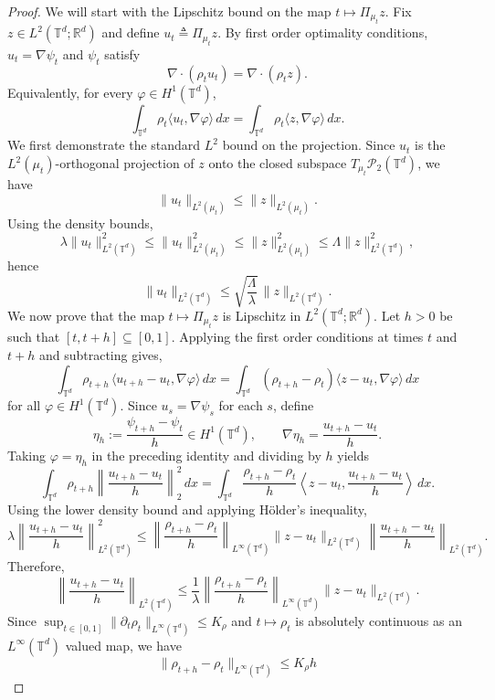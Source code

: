 \documentclass[11pt]{article}
\begin{document}
\begin{proof}
We will start with the Lipschitz bound on the map $t \mapsto \Pi_{\mu_t}z$. Fix $z\in L^2(\mathbb{T}^d;\mathbb R^d)$ and define $u_t \triangleq \Pi_{\mu_t}z$. By first order optimality conditions, $u_t=\nabla \psi_t$ and $\psi_t$ satisfy
\[
\nabla\cdot(\rho_t u_t) = \nabla\cdot(\rho_t z).
\]
Equivalently, for every $\varphi\in H^1(\mathbb{T}^d)$,
\[
\int_{\mathbb{T}^d} \rho_t \langle u_t,\nabla\varphi\rangle\,dx
=
\int_{\mathbb{T}^d} \rho_t \langle z,\nabla\varphi\rangle\,dx.
\]
We first demonstrate the standard $L^2$ bound on the projection. Since $u_t$ is the
$L^2(\mu_t)$-orthogonal projection of $z$ onto the closed subspace
$T_{\mu_t}\mathcal P_2(\mathbb{T}^d)$, we have
\[
\|u_t\|_{L^2(\mu_t)}\le \|z\|_{L^2(\mu_t)}.
\]
Using the density bounds,
\[
\lambda \|u_t\|_{L^2(\mathbb{T}^d)}^2
\le
\|u_t\|_{L^2(\mu_t)}^2
\le
\|z\|_{L^2(\mu_t)}^2
\le
\Lambda \|z\|_{L^2(\mathbb{T}^d)}^2,
\]
hence
\[
\|u_t\|_{L^2(\mathbb{T}^d)}
\le
\sqrt{\frac{\Lambda}{\lambda}}\,\|z\|_{L^2(\mathbb{T}^d)}.
\]
We now prove that the map $t \mapsto \Pi_{\mu_t}z$ is Lipschitz in $L^2(\mathbb{T}^d; \mathbb{R}^d).$ Let $h > 0$ be such that $[t, t+h] \subseteq [0,1]$. Applying the first order conditions at times $t$ and $t+h$ and subtracting gives,
\[\int_{\mathbb{T}^d}\rho_{t+h} \, \langle u_{t+h} - u_t, \nabla \varphi\rangle \, dx = \int_{\mathbb{T}^d}(\rho_{t+h}-\rho_t)\langle z-u_t, \nabla \varphi \rangle\, dx\]
for all $\varphi \in H^1(\mathbb{T}^d).$ Since $u_s=\nabla\psi_s$ for each $s$, define
\[
\eta_h:=\frac{\psi_{t+h}-\psi_t}{h}\in H^1(\mathbb{T}^d),
\qquad
\nabla\eta_h=\frac{u_{t+h}-u_t}{h}.
\]
Taking $\varphi=\eta_h$ in the preceding identity and dividing by $h$ yields
\[
\int_{\mathbb{T}^d}\rho_{t+h}\left\|\frac{u_{t+h}-u_t}{h}\right\|_2^2\,dx
=
\int_{\mathbb{T}^d}\frac{\rho_{t+h}-\rho_t}{h}
\left\langle z-u_t,\frac{u_{t+h}-u_t}{h}\right\rangle\,dx.
\]
Using the lower density bound and applying H\"older's inequality,
\[
\lambda\left\|\frac{u_{t+h}-u_t}{h}\right\|_{L^2(\mathbb{T}^d)}^2
\le
\left\|\frac{\rho_{t+h}-\rho_t}{h}\right\|_{L^\infty(\mathbb{T}^d)}
\|z-u_t\|_{L^2(\mathbb{T}^d)}
\left\|\frac{u_{t+h}-u_t}{h}\right\|_{L^2(\mathbb{T}^d)}.
\]
Therefore,
\[
\left\|\frac{u_{t+h}-u_t}{h}\right\|_{L^2(\mathbb{T}^d)}
\le
\frac{1}{\lambda}
\left\|\frac{\rho_{t+h}-\rho_t}{h}\right\|_{L^\infty(\mathbb{T}^d)}
\|z-u_t\|_{L^2(\mathbb{T}^d)}.
\]
Since $\sup_{t\in [0,1]}\|\partial_t\rho_t\|_{L^\infty(\mathbb{T}^d)} \leq K_\rho$ and $t \mapsto \rho_t$ is absolutely continuous as an $L^\infty(\mathbb{T}^d)$ valued map, we have
\[\|\rho_{t+h} - \rho_t\|_{L^\infty(\mathbb{T}^d)} \leq K_\rho h\]

\end{proof}
\end{document}
